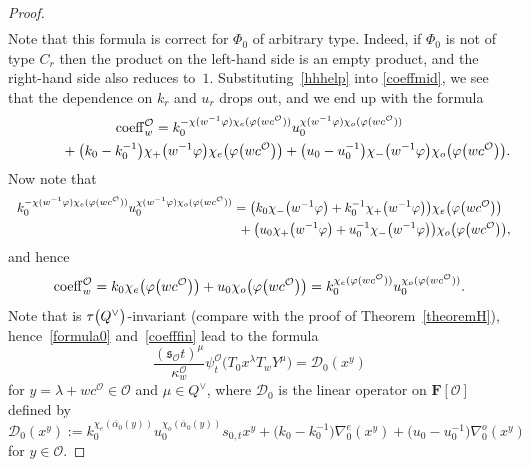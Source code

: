 \documentclass[pdftex]{sigma}
\numberwithin{equation}{section}
\begin{document}
\begin{proof}
\begin{gather*}
\end{gather*}
Note that this formula is correct for $\Phi_0$ of arbitrary type. Indeed, if $\Phi_0$ is not of type $C_r$ then the product on the left-hand side is an empty product, and the right-hand side also reduces to~$1$.
Substituting~\eqref{hhhelp} into
\eqref{coeffmid}, we see that
the dependence on $k_r$ and $u_r$ drops out, and we end up with the formula
\begin{gather*}
{\rm coeff}_w^\mathcal{O}=k_0^{-\chi(w^{-1}\varphi)\chi_e(\varphi(wc^\mathcal{O}))}
u_0^{\chi(w^{-1}\varphi)\chi_o(\varphi(wc^\mathcal{O}))}\\
\hphantom{{\rm coeff}_w^\mathcal{O}=}{}
+\bigl(k_0-k_0^{-1}\bigr)\chi_+\bigl(w^{-1}\varphi\bigr)\chi_e\bigl(\varphi\bigl(wc^\mathcal{O}\bigr)\bigr)+
\bigl(u_0-u_0^{-1}\bigr)\chi_-\bigl(w^{-1}\varphi\bigr)\chi_o\bigl(\varphi\bigl(wc^\mathcal{O}\bigr)\bigr).
\end{gather*}
Now note that
\begin{gather*}
k_0^{-\chi(w^{-1}\varphi)\chi_e(\varphi(wc^\mathcal{O}))}
u_0^{\chi(w^{-1}\varphi)\chi_o(\varphi(wc^\mathcal{O}))}=\bigl(k_0\chi_-\bigl(w^{-1}\varphi\bigr)+k_0^{-1}\chi_+\bigl(w^{-1}\varphi\bigr)\bigr)\chi_e \bigl(\varphi\bigl(wc^\mathcal{O}\bigr)\bigr)\\
\hphantom{k_0^{-\chi(w^{-1}\varphi)\chi_e(\varphi(wc^\mathcal{O}))}
u_0^{\chi(w^{-1}\varphi)\chi_o(\varphi(wc^\mathcal{O}))}=}{}
+\bigl(u_0\chi_+\bigl(w^{-1}\varphi\bigr)+u_0^{-1}\chi_-\bigl(w^{-1}\varphi\bigr)\bigr)\chi_o\bigl(\varphi\bigl(wc^\mathcal{O}\bigr)\bigr),
\end{gather*}
and hence
\begin{equation}\label{coefffin}
{\rm coeff}_w^\mathcal{O}=k_0\chi_e\bigl(\varphi\bigl(wc^\mathcal{O}\bigr)\bigr)+u_0\chi_o\bigl(\varphi\bigl(wc^\mathcal{O}\bigr)\bigr)=
k_0^{\chi_e(\varphi(wc^\mathcal{O}))}u_0^{\chi_o(\varphi(wc^\mathcal{O}))}.
\end{equation}
Note that  is $\tau\smash{\bigl(Q^\vee\bigr)}$-invariant (compare with the proof of Theorem~\ref{theoremH}),
hence~\eqref{formula0} and~\eqref{coefffin} lead to the formula
\begin{equation*}
\frac{(\mathfrak{s}_\mathcal{O}t)^\mu}{\kappa_w^\mathcal{O}}\psi_{t}^\mathcal{O}\bigl(T_0x^\lambda T_wY^\mu\bigr)=\mathcal{D}_0(x^y)
\end{equation*}
for $y=\lambda+wc^\mathcal{O}\in\mathcal{O}$ and $\mu\in Q^\vee$, where $\mathcal{D}_0$ is the linear operator on $\mathbf{F}[\mathcal{O}]$ defined by
\[
\mathcal{D}_0(x^y):=
k_0^{\chi_e(\overline{\alpha}_0(y))}u_0^{\chi_o(\overline{\alpha}_0(y))}s_{0,t}x^y+\bigl(k_0-k_0^{-1}\bigr)\nabla_0^e(x^y)+\bigl(u_0-u_0^{-1}\bigr)\nabla_0^o(x^y)
\]
for $y\in\mathcal{O}$.


\end{proof}
\end{document}

